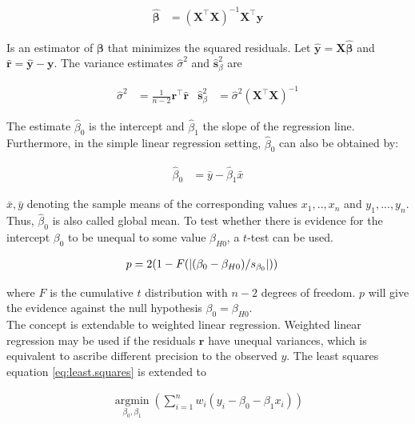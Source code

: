 \documentclass[11pt,a4paper,twoside]{book}\usepackage[]{graphicx}\usepackage[]{color}
\begin{document}
\begin{align}
\hat{\mathbf{\beta}} &= (\mathbf{X}^\top \mathbf{X})^{-1} \mathbf{X}^\top \mathbf{y} \label{eq:regression.parameters}
\end{align}

Is an estimator of $\mathbf{\beta}$ that minimizes the squared residuals. Let $\hat{\mathbf{y}} = \mathbf{X}\hat{\mathbf{\beta}}$ and $\hat{\mathbf{r}} = \hat{\mathbf{y}} - \mathbf{y}$. The variance estimates $\hat{\sigma}^2$ and $\hat{\mathbf{s}}_\beta^2$ are

\begin{align}
\hat{\sigma}^2 &= \frac{1}{n-2}\mathbf{r}^\top \hat{\mathbf{r}} & \hat{\mathbf{s}}_\beta^2 &= \hat{\sigma}^2 (\mathbf{X}^\top \mathbf{X})^{-1} \label{eq:regression.variances}
\end{align}

The estimate $\hat{\beta}_0$ is the intercept and $\hat{\beta}_1$ the slope of the regression line. Furthermore, in the simple linear regression setting, $\hat{\beta}_0$ can also be obtained by:

\begin{align}
\hat{\beta}_0 &= \bar{y} - \hat{\beta}_1 \bar{x} \nonumber
\end{align}

$\bar{x}, \bar{y}$ denoting the sample means of the corresponding values $x_1, .., x_n$ and $y_1, ..., y_n$. Thus, $\hat{\beta}_0$ is also called global mean.
To test whether there is evidence for the intercept $\beta_0$ to be unequal to some value $\beta_{H0}$, a $t$-test can be used. 

\begin{align}
p &= 2(1-F(\left\lvert(\beta_0 - \beta_{H0})/s_{\beta_0}\right\rvert)) \nonumber
\end{align}

where $F$ is the cumulative $t$ distribution with $n-2$ degrees of freedom. $p$ will give the evidence against the null hypothesis $\beta_0 = \beta_{H0}$. \\
The concept is extendable to weighted linear regression. Weighted linear regression may be used if the residuals $\mathbf{r}$ have unequal variances, which is equivalent to ascribe different precision to the observed $y$. The least squares equation \eqref{eq:least.squares} is extended to

\begin{align}
\operatorname*{argmin}_{\beta_0, \beta_1}(\sum_{i = 1}^n w_i(y_i - \beta_0 - \beta_1 x_i)) \nonumber
\end{align}
\end{document}

